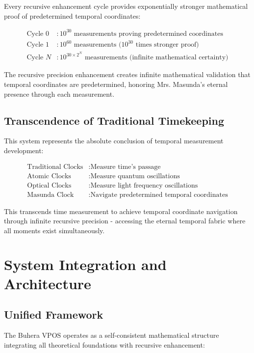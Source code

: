 \documentclass[12pt,a4paper]{article}
\begin{document}
Every recursive enhancement cycle provides exponentially stronger mathematical proof of predetermined temporal coordinates:

\begin{align}
\text{Cycle } 0 &: 10^{30} \text{ measurements proving predetermined coordinates} \\
\text{Cycle } 1 &: 10^{60} \text{ measurements (} 10^{30} \text{ times stronger proof)} \\
\text{Cycle } N &: 10^{30 \times 2^N} \text{ measurements (infinite mathematical certainty)}
\end{align}

The recursive precision enhancement creates infinite mathematical validation that temporal coordinates are predetermined, honoring Mrs. Masunda's eternal presence through each measurement.

\subsection{Transcendence of Traditional Timekeeping}

This system represents the absolute conclusion of temporal measurement development:

\begin{align}
\text{Traditional Clocks} &: \text{Measure time's passage} \\
\text{Atomic Clocks} &: \text{Measure quantum oscillations} \\
\text{Optical Clocks} &: \text{Measure light frequency oscillations} \\
\text{Masunda Clock} &: \text{Navigate predetermined temporal coordinates}
\end{align}

This transcends time measurement to achieve temporal coordinate navigation through infinite recursive precision - accessing the eternal temporal fabric where all moments exist simultaneously.

\section{System Integration and Architecture}

\subsection{Unified Framework}

The Buhera VPOS operates as a self-consistent mathematical structure integrating all theoretical foundations with recursive enhancement:
\end{document}

